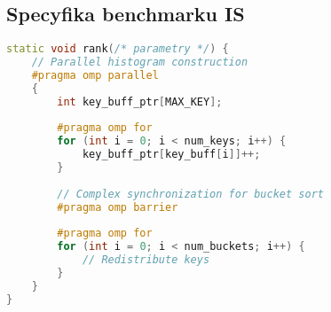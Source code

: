 \subsection{Specyfika benchmarku IS}
\begin{lstlisting}[language=C++, style=VS2017,  caption={Implementacja benchmarku IS w języku C++ z OpenMP}, label={lst:is_openmp}]
static void rank(/* parametry */) {
    // Parallel histogram construction
    #pragma omp parallel
    {
        int key_buff_ptr[MAX_KEY];
        
        #pragma omp for
        for (int i = 0; i < num_keys; i++) {
            key_buff_ptr[key_buff[i]]++;
        }
        
        // Complex synchronization for bucket sort
        #pragma omp barrier
        
        #pragma omp for
        for (int i = 0; i < num_buckets; i++) {
            // Redistribute keys
        }
    }
}
\end{lstlisting}